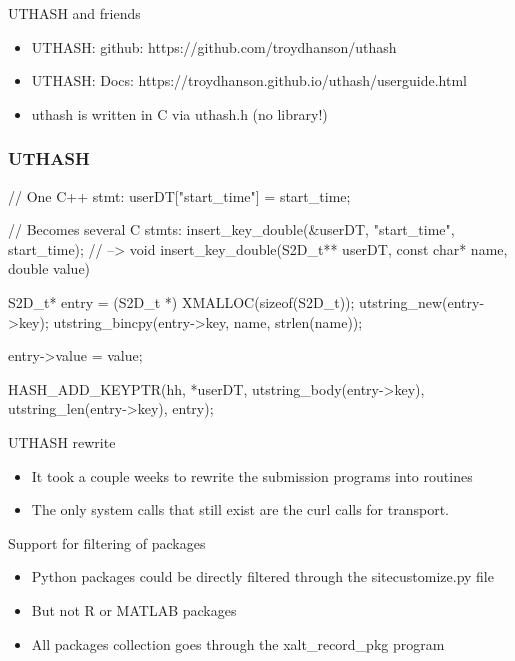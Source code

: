 \documentclass{beamer}
\begin{document}
\begin{frame}{UTHASH and friends}
  \begin{itemize}
    \item UTHASH: github: https://github.com/troydhanson/uthash
    \item UTHASH: Docs:
      https://troydhanson.github.io/uthash/userguide.html
    \item uthash is written in C via uthash.h (no library!)
  \end{itemize}
\end{frame}

\begin{frame}[fragile]
    \frametitle{UTHASH}
 {\tiny
    \begin{semiverbatim}
// One C++ stmt:
userDT["start\_time"] = start\_time;

// Becomes several C stmts:
insert_key_double(&userDT, "start_time",  start_time);
// -->
void insert\_key\_double(S2D\_t** userDT, const char* name, double value)
{
  S2D\_t* entry = (S2D\_t *) XMALLOC(sizeof(S2D\_t));
  utstring\_new(entry->key);
  utstring\_bincpy(entry->key, name, strlen(name));

  entry->value = value;

  HASH\_ADD\_KEYPTR(hh, *userDT, utstring\_body(entry->key),
                    utstring\_len(entry->key), entry);
}
    \end{semiverbatim}
}
\end{frame}

\begin{frame}{UTHASH rewrite}
  \begin{itemize}
    \item It took a couple weeks to rewrite the submission programs
      into routines
    \item The only system calls that still exist are the curl calls
      for transport.
  \end{itemize}
\end{frame}

\begin{frame}{Support for filtering of packages}
  \begin{itemize}
    \item Python packages could be directly filtered through the
      sitecustomize.py file
    \item But not R or MATLAB packages
    \item All packages collection goes through the xalt\_record\_pkg
      program
  \end{itemize}
\end{frame}
\end{document}
